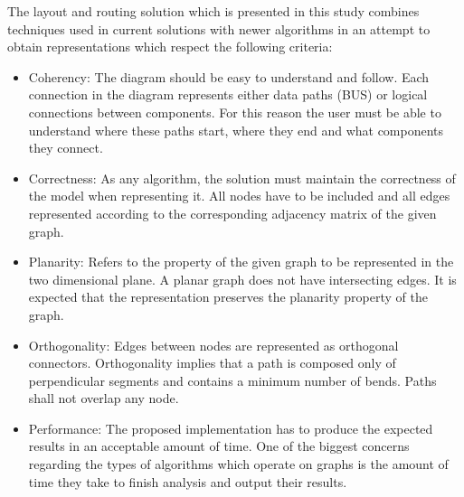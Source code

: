The layout and routing solution which is presented in this study combines techniques used in current solutions with newer algorithms 
in an attempt to obtain representations which respect the following criteria:\label{intro}

\begin{itemize}

\item Coherency: The diagram should be easy to understand and follow. Each connection in the diagram represents either 
data paths (BUS) or logical connections between components. For this reason the user must be able to understand where these paths start, 
where they end and what components they connect.

\item Correctness: As any algorithm, the solution must maintain the correctness of the model when representing it. All nodes have to be
included and all edges represented according to the corresponding adjacency matrix of the given graph.

\item Planarity: Refers to the property of the given graph to be represented in the two dimensional plane. A planar graph does not have 
intersecting edges. It is expected that the representation preserves the planarity property of the graph.

\item Orthogonality: Edges between nodes are represented as orthogonal connectors. Orthogonality implies that a path is composed only
of perpendicular segments and contains a minimum number of bends. Paths shall not overlap any node.

\item Performance: The proposed implementation has to produce the expected results in an acceptable amount of time. One of the biggest 
concerns regarding the types of algorithms which operate on graphs is the amount of time they take to finish analysis and output 
their results.

\end{itemize}
